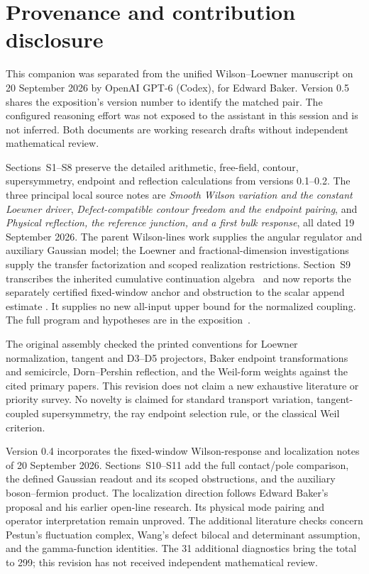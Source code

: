 \section{Provenance and contribution disclosure}\label{app:provenance}

This companion was separated from the unified Wilson--Loewner
manuscript on 20 September 2026 by OpenAI GPT-6 (Codex), for
Edward Baker. Version 0.5 shares the exposition's version number
to identify the matched pair. The configured reasoning effort
was not exposed to the assistant in this session and is not
inferred. Both documents are working research drafts without
independent mathematical review.

Sections~S1--S8 preserve the detailed arithmetic, free-field,
contour, supersymmetry, endpoint and reflection calculations from
versions 0.1--0.2. The three principal local source notes are
\emph{Smooth Wilson variation and the constant Loewner driver},
\emph{Defect-compatible contour freedom and the endpoint pairing},
and \emph{Physical reflection, the reference junction, and a first
bulk response}, all dated 19 September 2026. The parent
Wilson-lines work supplies the angular regulator and auxiliary
Gaussian model; the Loewner and fractional-dimension investigations
supply the transfer factorization and scoped realization restrictions.
Section~S9 transcribes the inherited cumulative continuation
algebra~\cite{CumulativePath} and now reports the separately
certified fixed-window anchor and obstruction to the scalar append
estimate \cite{EMAAnchor,CumulativeAppend}. It supplies no new
all-input upper bound for the normalized coupling. The full program and hypotheses are in the
exposition~\cite{Exposition}.

The original assembly checked the printed conventions for Loewner
normalization, tangent and D3--D5 projectors, Baker endpoint
transformations and semicircle, Dorn--Pershin reflection, and the
Weil-form weights against the cited primary papers. This revision
does not claim a new exhaustive literature or priority survey.
No novelty is claimed for standard transport variation,
tangent-coupled supersymmetry, the ray endpoint selection rule,
or the classical Weil criterion.

Version 0.4 incorporates the fixed-window Wilson-response and
localization notes of 20 September 2026. Sections~S10--S11 add the
full contact/pole comparison, the defined Gaussian readout and its
scoped obstructions, and the auxiliary boson--fermion product.
The localization direction follows Edward Baker's proposal and
his earlier open-line research. Its physical mode pairing and
operator interpretation remain unproved. The additional literature
checks concern Pestun's fluctuation complex, Wang's defect bilocal
and determinant assumption, and the gamma-function identities.
The 31 additional diagnostics bring the total to 299; this revision
has not received independent mathematical review.

